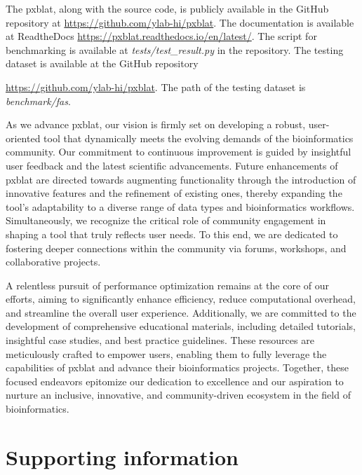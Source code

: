 \documentclass[10pt,letterpaper]{article}
\begin{document}
The \gls{pxblat}, along with the source code, is publicly available in the GitHub repository at \url{https://github.com/ylab-hi/pxblat}.
The documentation is available at ReadtheDocs \url{https://pxblat.readthedocs.io/en/latest/}.
The script for benchmarking is available at \emph{tests/test\_result.py} in the repository.
The testing dataset is available at the GitHub repository {\url{https://github.com/ylab-hi/pxblat}.
The path of the testing dataset is \emph{benchmark/fas}.


As we advance \gls{pxblat}, our vision is firmly set on developing a robust, user-oriented tool that dynamically meets the evolving demands of the bioinformatics community.
Our commitment to continuous improvement is guided by insightful user feedback and the latest scientific advancements. Future enhancements of \gls{pxblat} are directed towards augmenting functionality through the introduction of innovative features and the refinement of existing ones, thereby expanding the tool's adaptability to a diverse range of data types and bioinformatics workflows.
Simultaneously, we recognize the critical role of community engagement in shaping a tool that truly reflects user needs. To this end, we are dedicated to fostering deeper connections within the community via forums, workshops, and collaborative projects.

A relentless pursuit of performance optimization remains at the core of our efforts, aiming to significantly enhance efficiency, reduce computational overhead, and streamline the overall user experience.
Additionally, we are committed to the development of comprehensive educational materials, including detailed tutorials, insightful case studies, and best practice guidelines.
These resources are meticulously crafted to empower users, enabling them to fully leverage the capabilities of \gls{pxblat} and advance their bioinformatics projects.
Together, these focused endeavors epitomize our dedication to excellence and our aspiration to nurture an inclusive, innovative, and community-driven ecosystem in the field of bioinformatics.

%


\section*{Supporting information}

}
\end{document}
